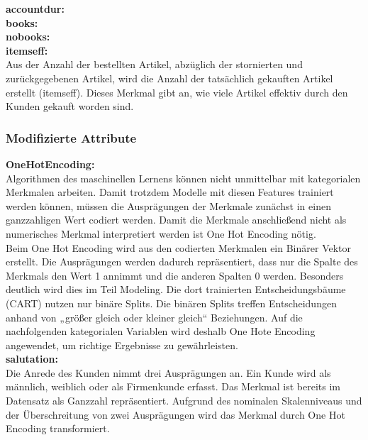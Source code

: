 \textbf{accountdur:}\\


\textbf{books:}\\



\textbf{nobooks:}\\


\textbf{itemseff:}\\

Aus der Anzahl der bestellten Artikel, abzüglich der stornierten und zurückgegebenen Artikel, wird die Anzahl der tatsächlich gekauften Artikel erstellt (itemseff). Dieses Merkmal gibt an, wie viele Artikel effektiv durch den Kunden gekauft worden sind.

\subsubsection{Modifizierte Attribute}

\textbf{OneHotEncoding:}\\

Algorithmen des maschinellen Lernens können nicht unmittelbar mit kategorialen Merkmalen arbeiten. Damit trotzdem Modelle mit diesen Features trainiert werden können, müssen die Ausprägungen der Merkmale zunächst in einen ganzzahligen Wert codiert werden. Damit die Merkmale anschließend nicht als numerisches Merkmal interpretiert werden ist One Hot Encoding nötig.\\

Beim One Hot Encoding wird aus den codierten Merkmalen ein Binärer Vektor erstellt. Die Ausprägungen werden dadurch repräsentiert, dass nur die Spalte des Merkmals den Wert 1 annimmt und die anderen Spalten 0 werden. Besonders deutlich wird dies im Teil Modeling. Die dort trainierten Entscheidungsbäume (CART) nutzen nur binäre Splits. Die binären Splits treffen Entscheidungen anhand von „größer gleich oder kleiner gleich“ Beziehungen. Auf die nachfolgenden kategorialen Variablen wird deshalb One Hote Encoding angewendet, um richtige Ergebnisse zu gewährleisten.\\


\textbf{salutation:}\\

Die Anrede des Kunden nimmt drei Ausprägungen an. Ein Kunde wird als männlich, weiblich oder als Firmenkunde erfasst. Das Merkmal ist bereits im Datensatz als Ganzzahl repräsentiert. Aufgrund des nominalen Skalenniveaus und der Überschreitung von zwei Ausprägungen wird das Merkmal durch One Hot Encoding transformiert. 

